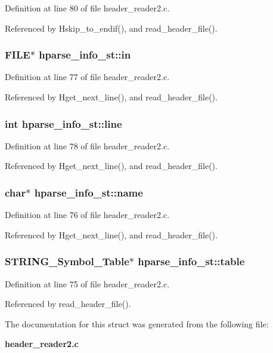 Definition at line 80 of file header\_\-reader2.c.

Referenced by Hskip\_\-to\_\-endif(), and read\_\-header\_\-file().
\subsubsection{\setlength{\rightskip}{0pt plus 5cm}FILE$\ast$ \bf{hparse\_\-info\_\-st::in}}\label{structhparse__info__st_4f67d1e4720eb89684dab7b7d847ea9c}




Definition at line 77 of file header\_\-reader2.c.

Referenced by Hget\_\-next\_\-line(), and read\_\-header\_\-file().
\subsubsection{\setlength{\rightskip}{0pt plus 5cm}int \bf{hparse\_\-info\_\-st::line}}\label{structhparse__info__st_fc6e23cc1b24fd8660de0f5a76f94c03}




Definition at line 78 of file header\_\-reader2.c.

Referenced by Hget\_\-next\_\-line(), and read\_\-header\_\-file().
\subsubsection{\setlength{\rightskip}{0pt plus 5cm}char$\ast$ \bf{hparse\_\-info\_\-st::name}}\label{structhparse__info__st_e6f44529056b337ea7faef2fd8380191}




Definition at line 76 of file header\_\-reader2.c.

Referenced by Hget\_\-next\_\-line(), and read\_\-header\_\-file().
\subsubsection{\setlength{\rightskip}{0pt plus 5cm}\bf{STRING\_\-Symbol\_\-Table}$\ast$ \bf{hparse\_\-info\_\-st::table}}\label{structhparse__info__st_6b396dace9be5ee8ee8d7bfdaa52caad}




Definition at line 75 of file header\_\-reader2.c.

Referenced by read\_\-header\_\-file().

The documentation for this struct was generated from the following file:\begin{CompactItemize}
\item 
\bf{header\_\-reader2.c}\end{CompactItemize}
